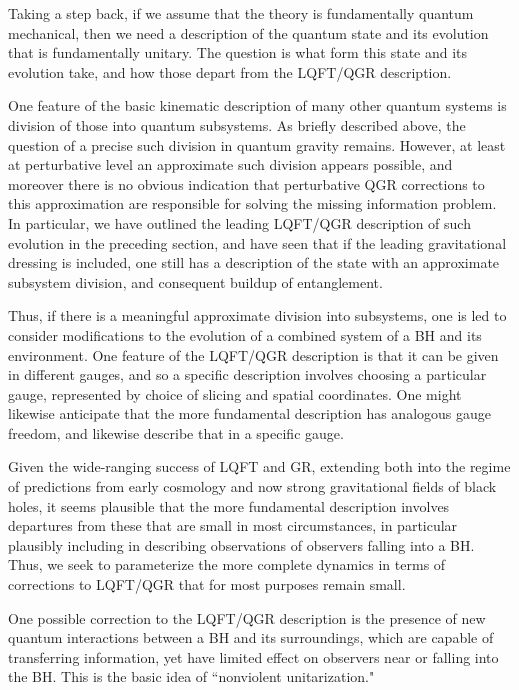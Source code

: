 \documentclass[11pt]{article}
\numberwithin{equation}{section}
\begin{document}
Taking a step back\cite{QFG,QGQF}, if we assume that the theory is fundamentally quantum mechanical, then we need a description of the quantum state and its evolution that is fundamentally unitary.  The question is what form this state and its evolution take, and how those depart from the LQFT/QGR description.  

One feature of the basic kinematic description of many other quantum systems is division of those into quantum subsystems.  As briefly described above, the question of a precise such division in quantum gravity remains.  However, at least at perturbative level an approximate such division appears possible, and moreover there is no obvious indication that perturbative QGR corrections to this approximation are responsible for solving the missing information problem.  In particular, we have outlined the leading LQFT/QGR description of such evolution in the preceding section, and have seen that if the leading gravitational dressing is included, one still has a description of the state with an approximate subsystem division, and consequent buildup of entanglement.
 
Thus, if there is a meaningful approximate division into subsystems, one is led\cite{BHthm} to consider modifications to the evolution of a combined system of a BH and its environment.  One feature of the LQFT/QGR description is that it can be given in different gauges, and so a specific description involves choosing a particular gauge, represented by choice of slicing and spatial coordinates\cite{SE2d}.  One might likewise anticipate that the more fundamental description has analogous gauge freedom, and likewise describe that in a specific gauge.

Given the wide-ranging success of LQFT and GR, extending both into the regime of predictions from early cosmology and now strong gravitational fields of black holes, it seems plausible that the more fundamental description involves departures from these that are small in most circumstances, in particular plausibly including in describing observations of observers falling into a BH.  Thus, we seek to parameterize the more complete dynamics in terms of corrections to LQFT/QGR that for most purposes remain small.

One possible correction to the LQFT/QGR description is the presence of new quantum  interactions between a BH and its surroundings, which are capable of transferring information, yet have limited effect on observers near or falling into the BH.  This is the basic idea of ``nonviolent unitarization."  
\end{document}
